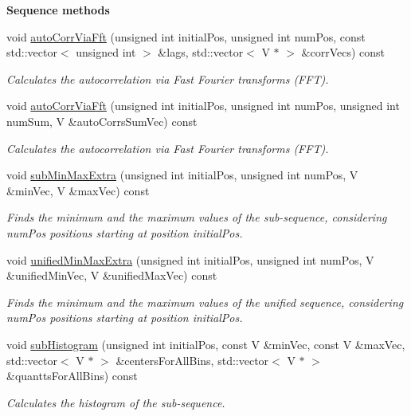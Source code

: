 \begin{Indent}{\bf Sequence methods}
\begin{DoxyCompactItemize}
void \hyperlink{class_q_u_e_s_o_1_1_sequence_of_vectors_ac4f7e6626d4c18b89003e442e91281ea}{auto\-Corr\-Via\-Fft} (unsigned int initial\-Pos, unsigned int num\-Pos, const std\-::vector$<$ unsigned int $>$ \&lags, std\-::vector$<$ V $\ast$ $>$ \&corr\-Vecs) const 
\begin{DoxyCompactList}\small\item\em Calculates the autocorrelation via Fast Fourier transforms (F\-F\-T). \end{DoxyCompactList}\item 
void \hyperlink{class_q_u_e_s_o_1_1_sequence_of_vectors_aea06bdd27167a184fb4bf80f85c8fcff}{auto\-Corr\-Via\-Fft} (unsigned int initial\-Pos, unsigned int num\-Pos, unsigned int num\-Sum, V \&auto\-Corrs\-Sum\-Vec) const 
\begin{DoxyCompactList}\small\item\em Calculates the autocorrelation via Fast Fourier transforms (F\-F\-T). \end{DoxyCompactList}\item 
void \hyperlink{class_q_u_e_s_o_1_1_sequence_of_vectors_a00bb55607fc38bfd59d65bb53d31fe6f}{sub\-Min\-Max\-Extra} (unsigned int initial\-Pos, unsigned int num\-Pos, V \&min\-Vec, V \&max\-Vec) const 
\begin{DoxyCompactList}\small\item\em Finds the minimum and the maximum values of the sub-\/sequence, considering {\ttfamily num\-Pos} positions starting at position {\ttfamily initial\-Pos}. \end{DoxyCompactList}\item 
void \hyperlink{class_q_u_e_s_o_1_1_sequence_of_vectors_ad7abbd1b4895135796d24206edff778d}{unified\-Min\-Max\-Extra} (unsigned int initial\-Pos, unsigned int num\-Pos, V \&unified\-Min\-Vec, V \&unified\-Max\-Vec) const 
\begin{DoxyCompactList}\small\item\em Finds the minimum and the maximum values of the unified sequence, considering {\ttfamily num\-Pos} positions starting at position {\ttfamily initial\-Pos}. \end{DoxyCompactList}\item 
void \hyperlink{class_q_u_e_s_o_1_1_sequence_of_vectors_a175f159aae54514b666c0f845997d8b3}{sub\-Histogram} (unsigned int initial\-Pos, const V \&min\-Vec, const V \&max\-Vec, std\-::vector$<$ V $\ast$ $>$ \&centers\-For\-All\-Bins, std\-::vector$<$ V $\ast$ $>$ \&quantts\-For\-All\-Bins) const 
\begin{DoxyCompactList}\small\item\em Calculates the histogram of the sub-\/sequence. \end{DoxyCompactList}\item 

\end{DoxyCompactItemize}
\end{Indent}
